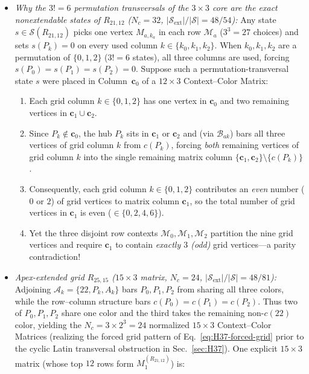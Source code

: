 \documentclass[aps,pra,reprint,superscriptaddress,longbibliography,nofootinbib,floatfix,10pt]{revtex4-2}
\theoremstyle{definition}\newtheorem{definition}[theorem]{Definition}
\theoremstyle{remark}\newtheorem{remark}[theorem]{Remark}
\newcommand{\Sc}{\mathcal S}\newcommand{\Cc}{\mathcal C}
\begin{document}
\begin{itemize}
\item \emph{Why the $3!=6$ permutation transversals of the $3\times 3$ core are the exact nonextendable states of $R_{21,12}$ ($N_c=32$, $|\Sc_{\mathrm{ext}}|/|\Sc|=48/54$):} Any state $s\in\Sc(R_{21,12})$ picks one vertex $M_{a,k_a}$ in each row $\mathcal{M}_a$ ($3^3=27$ choices) and sets $s(P_k)=0$ on every used column $k\in\{k_0,k_1,k_2\}$. When $k_0,k_1,k_2$ are a permutation of $\{0,1,2\}$ ($3!=6$ states), all three columns are used, forcing $s(P_0)=s(P_1)=s(P_2)=0$. Suppose such a permutation-transversal state $s$ were placed in Column~$\mathbf{c}_0$ of a $12\times 3$ Context--Color Matrix:
\begin{enumerate}
\item Each grid column $k\in\{0,1,2\}$ has one vertex in $\mathbf{c}_0$ and two remaining vertices in $\mathbf{c}_1\cup\mathbf{c}_2$.
\item Since $P_k\notin\mathbf{c}_0$, the hub $P_k$ sits in $\mathbf{c}_1$ or $\mathbf{c}_2$ and (via $\mathcal{B}_{ak}$) bars all three vertices of grid column $k$ from $c(P_k)$, forcing \emph{both} remaining vertices of grid column $k$ into the single remaining matrix column $\{\mathbf{c}_1,\mathbf{c}_2\}\setminus\{c(P_k)\}$.
\item Consequently, each grid column $k\in\{0,1,2\}$ contributes an \emph{even} number ($0$ or $2$) of grid vertices to matrix column $\mathbf{c}_1$, so the total number of grid vertices in $\mathbf{c}_1$ is even ($\in\{0,2,4,6\}$).
\item Yet the three disjoint row contexts $\mathcal{M}_0,\mathcal{M}_1,\mathcal{M}_2$ partition the nine grid vertices and require $\mathbf{c}_1$ to contain \emph{exactly $3$ (odd)} grid vertices---a parity contradiction!
\end{enumerate}
\item \emph{Apex-extended grid $R_{25,15}$ ($15\times 3$ matrix, $N_c=24$, $|\Sc_{\mathrm{ext}}|/|\Sc|=48/81$):} Adjoining $\mathcal{A}_k=\{22,P_k,A_k\}$ bars $P_0,P_1,P_2$ from sharing all three colors, while the row--column structure bars $c(P_0)=c(P_1)=c(P_2)$. Thus two of $P_0,P_1,P_2$ share one color and the third takes the remaining non-$c(22)$ color, yielding the $N_c=3\times 2^3=24$ normalized $15\times 3$ Context--Color Matrices (realizing the forced grid pattern of Eq.~\eqref{eq:H37-forced-grid} prior to the cyclic Latin transversal obstruction in Sec.~\ref{sec:H37}). One explicit $15\times 3$ matrix (whose top $12$ rows form $M_1^{(R_{21,12})}$) is:
\end{itemize}
\end{document}
